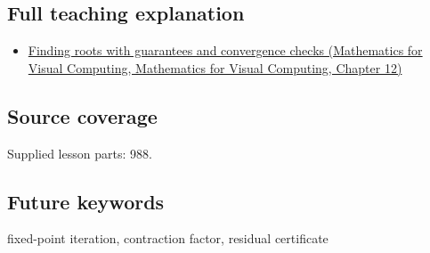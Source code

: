 \subsection{Full teaching explanation}\label{appendix-d83b0ad1be7f-full-teaching-explanation}

\begin{itemize}
\tightlist
\item
  \href{../02-Mathematics-for-Visual-Computing/main.pdf\#nameddest=02-foundations-ii-ch028-finding-roots-with-guarantees-and-convergence-checks}{Finding roots with guarantees and convergence checks (Mathematics for Visual Computing, Mathematics for Visual Computing, Chapter 12)}
\end{itemize}

\subsection{Source coverage}\label{appendix-d83b0ad1be7f-source-coverage}

Supplied lesson parts: 988.

\subsection{Future keywords}\label{appendix-d83b0ad1be7f-future-keywords}

fixed-point iteration, contraction factor, residual certificate
